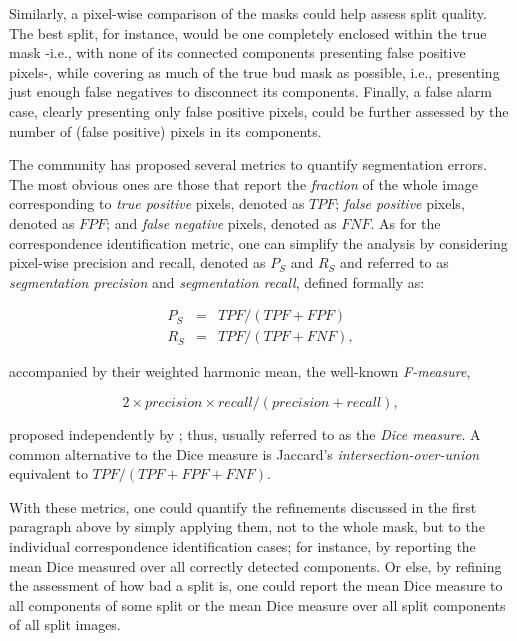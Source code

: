 \documentclass[a4paper,authoryear,review]{elsarticle}
\begin{document}
	Similarly, a pixel-wise comparison of the masks could help assess split quality. The best split, for instance, would be one completely enclosed within the true mask -i.e., with none of its connected components presenting false positive pixels-, while covering as much of the true bud mask as possible, i.e., presenting just enough false negatives to disconnect its components. Finally, a false alarm case, clearly presenting only false positive pixels, could be further assessed by the number of (false positive) pixels in its components. 
	
	The community has proposed several metrics to quantify segmentation errors. The most obvious ones are those that report the \emph{fraction} of the whole image corresponding to \emph{true positive} pixels, denoted as $TPF$; \emph{false positive} pixels,  denoted as $FPF$;  and \emph{false negative} pixels, denoted as $FNF$. As for the correspondence identification metric, one can simplify the analysis by considering pixel-wise precision and recall, denoted as  $P_S$ and $R_S$ and referred to as \emph{segmentation precision} and \emph{segmentation recall}, defined formally as: 
	
	\begin{eqnarray*} 
		P_S &=& TPF / (TPF + FPF) \\
		R_S &=& TPF / (TPF + FNF),
	\end{eqnarray*}
	
	accompanied by their weighted harmonic mean, the well-known \emph{F-measure}, 
	
	\begin{equation} 
		2 \times precision \times recall / (precision + recall),
	\end{equation}
	
	proposed independently by \citet{dice1945measures}; thus, usually referred to as the \emph{Dice measure}. A common alternative to the Dice measure is Jaccard’s \emph{intersection-over-union} \citep{jaccard1912distribution} equivalent to $TPF / (TPF+FPF+FNF)$. 
	
	With these metrics, one could quantify the refinements discussed in the first paragraph above by simply applying them, not to the whole mask, but to the individual correspondence identification cases; for instance, by reporting the mean Dice measured over all correctly detected components. Or else, by refining the assessment of how bad a split is, one could report the mean Dice measure to all components of some split or the mean Dice measure over all split components of all split images. 
	
\end{document}
